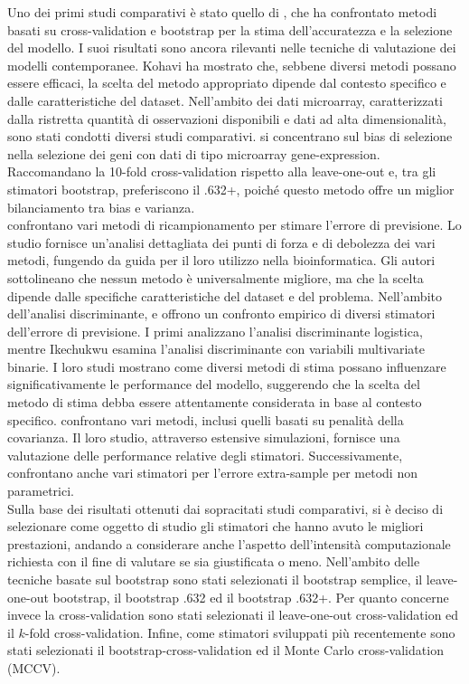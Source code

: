 Uno dei primi studi comparativi è stato quello di \textcite{Kohavi}, che ha confrontato metodi basati su cross-validation e bootstrap per la stima dell’accuratezza e la selezione del modello. I suoi risultati sono ancora rilevanti nelle tecniche di valutazione dei modelli contemporanee. Kohavi ha mostrato che, sebbene diversi metodi possano essere efficaci, la scelta del metodo appropriato dipende dal contesto specifico e dalle caratteristiche del dataset. Nell’ambito dei dati microarray, caratterizzati dalla ristretta quantità di osservazioni disponibili e dati ad alta dimensionalità, sono stati condotti diversi studi comparativi. \textcite{mclachlan} si concentrano sul bias di selezione nella selezione dei geni con dati di tipo microarray gene-expression. Raccomandano la 10-fold cross-validation rispetto alla leave-one-out e, tra gli stimatori bootstrap, preferiscono il .632+, poiché questo metodo offre un miglior bilanciamento tra bias e varianza.\\
\textcite{molinaro2005} confrontano vari metodi di ricampionamento per stimare l’errore di previsione. Lo studio fornisce un’analisi dettagliata dei punti di forza e di debolezza dei vari metodi, fungendo da guida per il loro utilizzo nella bioinformatica. Gli autori sottolineano che nessun metodo è universalmente migliore, ma che la scelta dipende dalle specifiche caratteristiche del dataset e del problema. Nell’ambito dell’analisi discriminante, \textcite{empirical} e \textcite{Ikechukwu} offrono un confronto empirico di diversi stimatori dell’errore di previsione. I primi analizzano l’analisi discriminante logistica, mentre Ikechukwu esamina l’analisi discriminante con variabili multivariate binarie. I loro studi mostrano come diversi metodi di stima possano influenzare significativamente le performance del modello, suggerendo che la scelta del metodo di stima debba essere attentamente considerata in base al contesto specifico. \textcite{techrep} confrontano vari metodi, inclusi quelli basati su penalità della covarianza. Il loro studio, attraverso estensive simulazioni, fornisce una valutazione delle performance relative degli stimatori. Successivamente, \textcite{diciaccio} confrontano anche vari stimatori per l’errore extra-sample per metodi non parametrici. \\
Sulla base dei risultati ottenuti dai sopracitati studi comparativi, si è deciso di selezionare come oggetto di studio gli stimatori che hanno avuto le migliori prestazioni, andando a considerare anche l'aspetto dell'intensità computazionale richiesta con il fine di valutare se sia giustificata o meno. Nell'ambito delle tecniche basate sul bootstrap sono stati selezionati il bootstrap semplice, il leave-one-out bootstrap, il bootstrap .632 ed il bootstrap .632+. Per quanto concerne invece la cross-validation sono stati selezionati il leave-one-out cross-validation ed il $k$-fold cross-validation. Infine, come stimatori sviluppati più recentemente sono stati selezionati il bootstrap-cross-validation ed il Monte Carlo cross-validation (MCCV).


